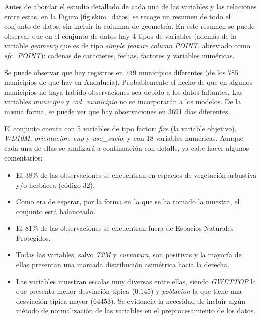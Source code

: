 \documentclass[12pt,a4paper,]{book}
\providecommand{\tightlist}{%
  \setlength{\itemsep}{0pt}\setlength{\parskip}{0pt}}
\numberwithin{dummy}{section}
\theoremstyle{ocrenumbox}
\theoremstyle{blacknumex}
\theoremstyle{blacknumbox}
\theoremstyle{ocrenum}
\theoremstyle{ocrenum}
\begin{document}
Antes de abordar el estudio detallado de cada una de las variables y las
relaciones entre estas, en la Figura \ref{fig:skim_datos} se recoge un
resumen de todo el conjunto de datos, sin incluir la columna de
geometría. En este resumen se puede observar que en el conjunto de datos
hay 4 tipos de variables (además de la variable \emph{geometry} que es
de tipo \emph{simple feature column POINT}, abreviado como
\emph{sfc\_POINT}): cadenas de caracteres, fechas, factores y variables
numéricas.

Se puede observar que hay registros en 749 municipios diferentes (de los
785 municipios de que hay en Andalucía). Probablemente el hecho de que
en algunos municipios no haya habido observaciones sea debido a los
datos faltantes. Las variables \emph{municipio} y \emph{cod\_municipio}
no se incorporarán a los modelos. De la misma forma, se puede ver que
hay observaciones en 3691 días diferentes.

El conjunto cuenta con 5 variables de tipo factor: \emph{fire} (la
variable objetivo), \emph{WD10M}, \emph{orientacion}, \emph{enp} y
\emph{uso\_suelo}; y con 18 variables numéricas. Aunque cada una de
ellas se analizará a continuación con detalle, ya cabe hacer algunos
comentarios:

\begin{itemize}
\tightlist
\item
  El \(38\%\) de las observaciones se encuentran en espacios de
  vegetación arbustiva y/o herbácea (código 32).
\item
  Como era de esperar, por la forma en la que se ha tomado la muestra,
  el conjunto está balanceado.
\item
  El \(81\%\) de las observaciones se encuentran fuera de Espacios
  Naturales Protegidos.
\item
  Todas las variables, salvo \emph{T2M} y \emph{curvatura}, son
  positivas y la mayoría de ellas presentan una marcada distribución
  asimétrica hacia la derecha.
\item
  Las variables muestran escalas muy diversas entre ellas, siendo
  \emph{GWETTOP} la que presenta menor desviación típica (\(0.145\)) y
  \emph{poblacion} la que tiene una desviación típica mayor (\(64453\)).
  Se evidencia la necesidad de incluir algún método de normalización de
  las variables en el preprocesamiento de los datos.
\end{itemize}
\end{document}
